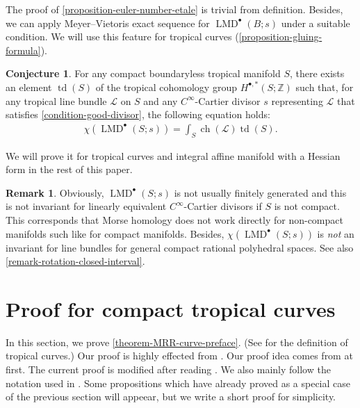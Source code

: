 \documentclass[a4paper,dvipdfmx,reqno,12pt]{amsart}
\theoremstyle{definition}
\newtheorem{conjecture}[theorem]{Conjecture}
\newtheorem{remark}[theorem]{Remark}
\newcommand{\mcal}[1]{\mathcal{#1}}%
\newcommand{\opn}[1]{\operatorname{#1}}
\numberwithin{equation}{section}
\begin{document}
The proof of \cref{proposition-euler-number-etale} is trivial from definition.
Besides, we can apply Meyer--Vietoris exact sequence 
for $\opn{LMD}^{\bullet}(B;s)$ under a suitable condition.
We will use this feature for tropical curves
(\cref{proposition-gluing-formula}).




\begin{conjecture} 
\label{conjecture-tropical-MRR}
For any compact boundaryless tropical manifold $S$, 
there exists an element $\opn{td}(S)$ of the tropical 
cohomology group $H^{\bullet,*}(S;\mathbb{Z})$ such that, 
for any tropical line bundle $\mathcal{L}$ on $S$ and 
any $C^{\infty}$-Cartier divisor $s$ representing 
$\mathcal{L}$ that satisfies 
\cref{condition-good-divisor}, 
the following equation holds:
\begin{align}
\chi(\opn{LMD}^{\bullet}(S;s))=
\int_S \opn{ch}(\mcal{L})\opn{td}(S).
\end{align}
\end{conjecture}

We will prove it for tropical curves and integral 
affine manifold with a Hessian form in the 
rest of this paper.

\begin{remark}
Obviously, $\opn{LMD}^{\bullet}(S;s)$ is not usually 
finitely generated and this is not invariant 
for linearly equivalent $C^{\infty}$-Cartier divisors
if $S$ is not compact.
This corresponds that Morse homology does not work directly
for non-compact manifolds such 
like for compact manifolds.
Besides, $\chi(\opn{LMD}^{\bullet}(S;s))$ is \emph{not}
an invariant for line bundles for general compact rational 
polyhedral spaces. See also 
\cref{remark-rotation-closed-interval}.  
\end{remark}







\section{Proof for compact tropical curves}
In this section, we prove \cref{theorem-MRR-curve-preface}. 
(See \cite[Definition 3.1]{mikhalkinTropicalCurvesTheir2008a} 
for the definition of tropical curves.)
Our proof is highly effected from 
\cite{knill2012graph,MR2676658,auroux2022lagrangian}.
Our proof idea comes from 
\cite{knill2012graph,MR2676658} at first.  
The current proof is modified after reading 
\cite{auroux2022lagrangian}.
We also mainly follow the notation used in 
\cite{auroux2022lagrangian}.
Some propositions which have already proved as a special case
of the previous section will appeear, but we write a short proof 
for simplicity.
\end{document}
